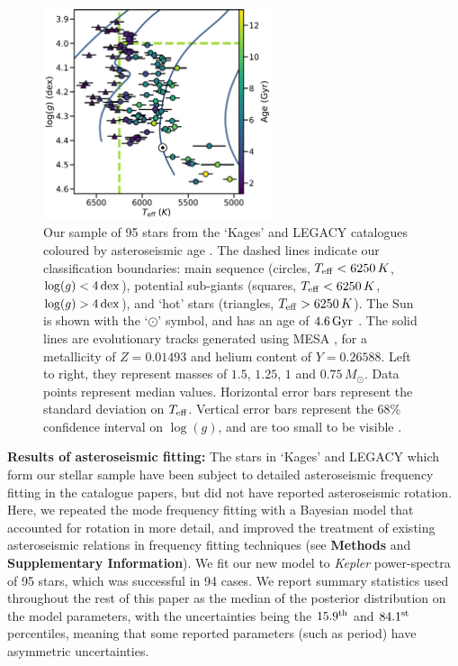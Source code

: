 \documentclass[12pt]{article}
\newcommand{\teff}{\mbox{$T_{\rm eff}$}\xspace}
\newcommand{\logg}{\mbox{$\log(g)$}\xspace}
\newcommand{\kepler}{\emph{Kepler}\xspace}
\begin{document}
\begin{figure}[h!]
	\centering
	\includegraphics[width=0.6\textwidth]{data.pdf}
	\caption{Our sample of 95 stars from the `Kages' and LEGACY catalogues coloured by asteroseismic age  \cite{silvaaguirre+2015, silvaaguirre+2017}. The dashed lines indicate our classification boundaries: main sequence (circles, $\teff < 6250\, K$, $\logg < 4\, \rm{dex}$), potential sub-giants (squares, $\teff < 6250\, K$, $\logg > 4\, \rm{dex}$), and `hot' stars (triangles, $\teff > 6250\, K$). The Sun is shown with the `$\odot$' symbol, and has an age of $4.6\, \rm{Gyr}$ \cite{bonanno+frohlich2015}. The solid lines are evolutionary tracks generated using MESA \cite{paxton+2017}, for a metallicity of $Z = 0.01493$ and helium content of $Y = 0.26588$. Left to right, they represent masses of $1.5$, $1.25$, $1$ and $0.75\, M_\odot$. Data points represent median values. Horizontal error bars represent the standard deviation on \teff. Vertical error bars represent the 68\% confidence interval on \logg, and are too small to be visible \cite{hunter2007}.}
	\label{fig:sample}
\end{figure}


\textbf{Results of asteroseismic fitting:} The stars in `Kages' and LEGACY which form our stellar sample have been subject to detailed asteroseismic frequency fitting in the catalogue papers, but did not have reported asteroseismic rotation. Here, we repeated the mode frequency fitting with a Bayesian model that accounted for rotation in more detail, and improved the treatment of existing asteroseismic relations in frequency fitting techniques (see \textbf{Methods} and \textbf{Supplementary Information}). We fit our new model to \kepler power-spectra of 95 stars, which was successful in 94 cases. We report summary statistics used throughout the rest of this paper as the median of the posterior distribution on the model parameters, with the uncertainties being the $15.9^{\rm th}$ and $84.1^{\rm st}$ percentiles, meaning that some reported parameters (such as period) have asymmetric uncertainties.
\end{document}
